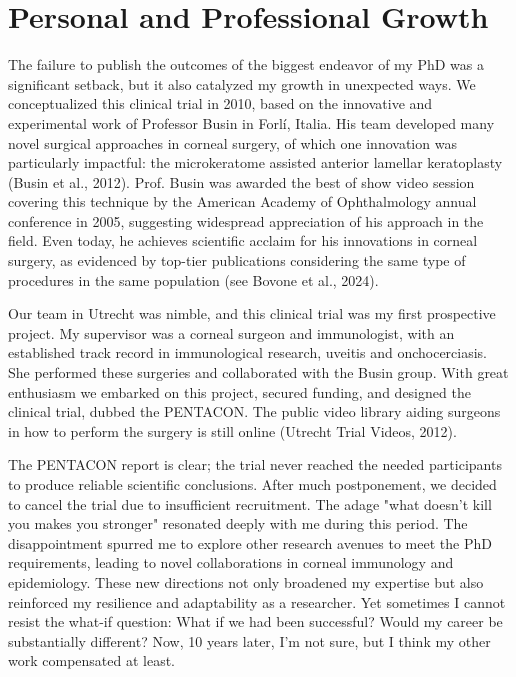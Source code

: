 \documentclass[authordate, empirical]{jote-new-article}
\author[1]{\mbox{Robert P.L. Wisse\orcid{0000-0002-2844-9868}}}
\affil[1]{University Medical Center, Utrecht, the Netherlands}
\begin{document}
\begin{frontmatter}
  \maketitle
  \begin{abstract}
    \printabstracttext
  \end{abstract}
\end{frontmatter}




	\section{Personal and Professional Growth}



	The failure to publish the outcomes of the biggest endeavor of my PhD was a significant setback, but it also catalyzed my growth in unexpected ways. We conceptualized this clinical trial in 2010, based on the innovative and experimental work of Professor Busin in Forlí, Italia. His team developed many novel surgical approaches in corneal surgery, of which one innovation was particularly impactful: the microkeratome assisted anterior lamellar keratoplasty (Busin et al., 2012). Prof. Busin was awarded the best of show video session covering this technique by the American Academy of Ophthalmology annual conference in 2005, suggesting widespread appreciation of his approach in the field. Even today, he achieves scientific acclaim for his innovations in corneal surgery, as evidenced by top-tier publications considering the same type of procedures in the same population (see Bovone et al., 2024).



	Our team in Utrecht was nimble, and this clinical trial was my first prospective project. My supervisor was a corneal surgeon and immunologist, with an established track record in immunological research, uveitis and onchocerciasis. She performed these surgeries and collaborated with the Busin group. With great enthusiasm we embarked on this project, secured funding, and designed the clinical trial, dubbed the PENTACON. The public video library aiding surgeons in how to perform the surgery is still online (Utrecht Trial Videos, 2012).



	The PENTACON report is clear; the trial never reached the needed participants to produce reliable scientific conclusions. After much postponement, we decided to cancel the trial due to insufficient recruitment. The adage "what doesn't kill you makes you stronger" resonated deeply with me during this period. The disappointment spurred me to explore other research avenues to meet the PhD requirements, leading to novel collaborations in corneal immunology and epidemiology. These new directions not only broadened my expertise but also reinforced my resilience and adaptability as a researcher. Yet sometimes I cannot resist the what-if question: What if we had been successful? Would my career be substantially different? Now, 10 years later, I'm not sure, but I think my other work compensated at least.
\end{document}
